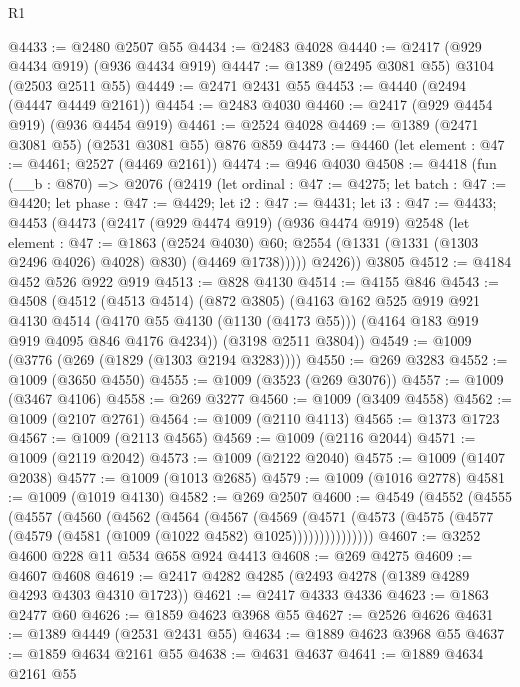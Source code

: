 \begin{lexlean}{R1}
\begin{coremodule}
@4433 := @2480 @2507 @55
@4434 := @2483 @4028
@4440 := @2417 (@929 @4434 @919) (@936 @4434 @919)
@4447 := @1389 (@2495 @3081 @55) @3104 (@2503 @2511 @55)
@4449 := @2471 @2431 @55
@4453 := @4440 (@2494 (@4447 @4449 @2161))
@4454 := @2483 @4030
@4460 := @2417 (@929 @4454 @919) (@936 @4454 @919)
@4461 := @2524 @4028
@4469 := @1389 (@2471 @3081 @55) (@2531 @3081 @55) @876 @859
@4473 := @4460 (let element : @47 := @4461; @2527 (@4469 @2161))
@4474 := @946 @4030
@4508 := @4418
    (fun (__b : @870) =>
    @2076
      (@2419
        (let ordinal : @47 := @4275;
        let batch : @47 := @4420;
        let phase : @47 := @4429;
        let i2 : @47 := @4431;
        let i3 : @47 := @4433;
        @4453
          (@4473
            (@2417
              (@929 @4474 @919)
              (@936 @4474 @919)
              @2548
              (let element : @47 := @1863 (@2524 @4030) @60;
              @2554 (@1331 (@1331 (@1303 @2496 @4026) @4028) @830) (@4469 @1738)))))
        @2426))
    @3805
@4512 := @4184 @452 @526 @922 @919
@4513 := @828 @4130
@4514 := @4155 @846
@4543 := @4508
    (@4512
      (@4513 @4514)
      (@872 @3805)
      (@4163
        @162
        @525
        @919
        @921
        @4130
        @4514
        (@4170 @55 @4130 (@1130 (@4173 @55)))
        (@4164 @183 @919 @919 @4095 @846 @4176 @4234))
      (@3198 @2511 @3804))
@4549 := @1009 (@3776 (@269 (@1829 (@1303 @2194 @3283))))
@4550 := @269 @3283
@4552 := @1009 (@3650 @4550)
@4555 := @1009 (@3523 (@269 @3076))
@4557 := @1009 (@3467 @4106)
@4558 := @269 @3277
@4560 := @1009 (@3409 @4558)
@4562 := @1009 (@2107 @2761)
@4564 := @1009 (@2110 @4113)
@4565 := @1373 @1723
@4567 := @1009 (@2113 @4565)
@4569 := @1009 (@2116 @2044)
@4571 := @1009 (@2119 @2042)
@4573 := @1009 (@2122 @2040)
@4575 := @1009 (@1407 @2038)
@4577 := @1009 (@1013 @2685)
@4579 := @1009 (@1016 @2778)
@4581 := @1009 (@1019 @4130)
@4582 := @269 @2507
@4600 := @4549
    (@4552
      (@4555
        (@4557
          (@4560
            (@4562
              (@4564
                (@4567
                  (@4569
                    (@4571
                      (@4573 (@4575 (@4577 (@4579 (@4581 (@1009 (@1022 @4582) @1025)))))))))))))))
@4607 := @3252 @4600 @228 @11 @534 @658 @924 @4413
@4608 := @269 @4275
@4609 := @4607 @4608
@4619 := @2417 @4282 @4285 (@2493 @4278 (@1389 @4289 @4293 @4303 @4310 @1723))
@4621 := @2417 @4333 @4336
@4623 := @1863 @2477 @60
@4626 := @1859 @4623 @3968 @55
@4627 := @2526 @4626
@4631 := @1389 @4449 (@2531 @2431 @55)
@4634 := @1889 @4623 @3968 @55
@4637 := @1859 @4634 @2161 @55
@4638 := @4631 @4637
@4641 := @1889 @4634 @2161 @55

\end{coremodule}
\end{lexlean}
